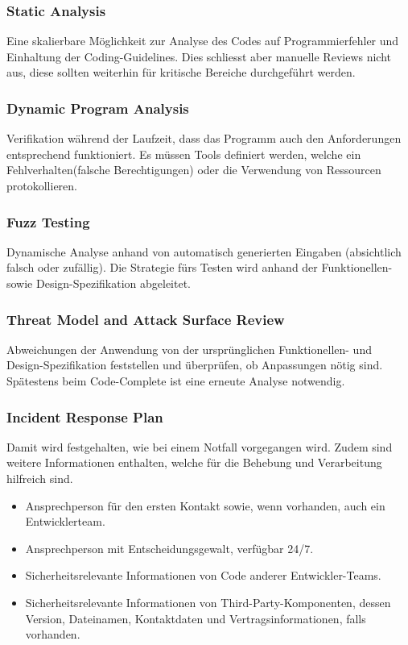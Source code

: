 \subsubsection{Static Analysis}
Eine skalierbare Möglichkeit zur Analyse des Codes auf Programmierfehler und Einhaltung der Coding-Guidelines. Dies schliesst aber manuelle Reviews nicht aus, diese sollten weiterhin für kritische Bereiche durchgeführt werden.

\subsubsection{Dynamic Program Analysis}
Verifikation während der Laufzeit, dass das Programm auch den Anforderungen entsprechend funktioniert. Es müssen Tools definiert werden, welche ein Fehlverhalten(falsche Berechtigungen) oder die Verwendung von Ressourcen protokollieren.

\subsubsection{Fuzz Testing}
Dynamische Analyse anhand von automatisch generierten Eingaben (absichtlich falsch oder zufällig). Die Strategie fürs Testen wird anhand der Funktionellen- sowie  Design-Spezifikation abgeleitet.

\subsubsection{Threat Model and Attack Surface Review}
Abweichungen der Anwendung von der ursprünglichen Funktionellen- und Design-Spezifikation feststellen und überprüfen, ob Anpassungen nötig sind. Spätestens beim Code-Complete ist eine erneute Analyse notwendig.

\subsubsection{Incident Response Plan}
Damit wird festgehalten, wie bei einem Notfall vorgegangen wird. Zudem sind weitere Informationen enthalten, welche für die Behebung und Verarbeitung hilfreich sind.
\begin{itemize}
	\item Ansprechperson für den ersten Kontakt sowie, wenn vorhanden, auch ein Entwicklerteam.
	\item Ansprechperson mit Entscheidungsgewalt, verfügbar 24/7.
	\item Sicherheitsrelevante Informationen von Code anderer Entwickler-Teams.
	\item Sicherheitsrelevante Informationen von Third-Party-Komponenten, dessen Version, Dateinamen, Kontaktdaten und Vertragsinformationen, falls vorhanden.
\end{itemize}

